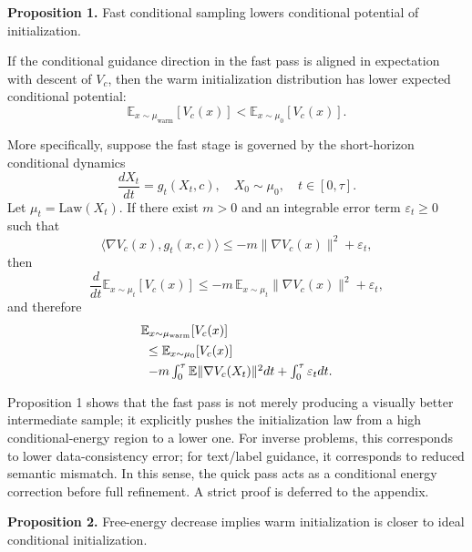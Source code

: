 \documentclass[letterpaper]{article} %
\begin{document}
\textbf{Proposition 1.} Fast conditional sampling lowers conditional potential of initialization.

If the conditional guidance direction in the fast pass is aligned in expectation with descent of $V_c$, then the warm initialization distribution has lower expected conditional potential:
\begin{equation}
\mathbb E_{x\sim\mu_{\mathrm{warm}}}[V_c(x)]<\mathbb E_{x\sim\mu_0}[V_c(x)].
\end{equation}

More specifically, suppose the fast stage is governed by the short-horizon conditional dynamics
\begin{equation}
\frac{dX_t}{dt}=g_t(X_t,c), \quad X_0\sim\mu_0, \quad t\in[0,\tau].
\end{equation}
Let $\mu_t=\mathrm{Law}(X_t)$. If there exist $m>0$ and an integrable error term $\varepsilon_t\ge 0$ such that
\begin{equation}
\langle\nabla V_c(x),g_t(x,c)\rangle\le -m\|\nabla V_c(x)\|^2+\varepsilon_t,
\end{equation}
then
\begin{equation}
\frac{d}{dt}\mathbb E_{x\sim\mu_t}[V_c(x)]\le -m\,\mathbb E_{x\sim\mu_t}\|\nabla V_c(x)\|^2+\varepsilon_t,
\end{equation}
and therefore
\begin{equation}
\begin{array}{l}
\mathbb E_{x\sim\mu_{\mathrm{warm}}}[V_c(x)] \\[4pt]
\hspace*{0.6em}\le \mathbb E_{x\sim\mu_0}[V_c(x)] \\[4pt]
\hspace*{0.6em}-m\int_0^\tau\mathbb E\|\nabla V_c(X_t)\|^2dt +\int_0^\tau\varepsilon_tdt.
\end{array}
\end{equation}

Proposition 1 shows that the fast pass is not merely producing a visually better intermediate sample; it explicitly pushes the initialization law from a high conditional-energy region to a lower one. For inverse problems, this corresponds to lower data-consistency error; for text/label guidance, it corresponds to reduced semantic mismatch. In this sense, the quick pass acts as a conditional energy correction before full refinement. A strict proof is deferred to the appendix.

\textbf{Proposition 2.} Free-energy decrease implies warm initialization is closer to ideal conditional initialization.
\end{document}
